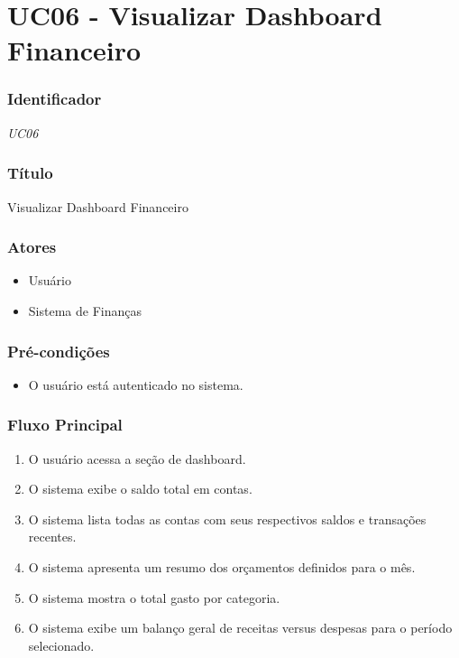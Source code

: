 \chapter{UC06 - Visualizar Dashboard Financeiro}
\label{apendiceUC06}

\subsection*{Identificador}
\textit{UC06}

\subsection*{Título}
Visualizar Dashboard Financeiro

\subsection*{Atores}
\begin{addmargin}[1.5cm]{0cm}
	\begin{itemize}
		\item Usuário
		\item Sistema de Finanças
	\end{itemize}
\end{addmargin}

\subsection*{Pré-condições}
\begin{addmargin}[1.5cm]{0cm}
	\begin{itemize}
		\item O usuário está autenticado no sistema.
	\end{itemize}
\end{addmargin}

\subsection*{Fluxo Principal}
\begin{addmargin}[1.5cm]{0cm}
	\begin{enumerate}
		\item O usuário acessa a seção de dashboard.
		\item O sistema exibe o saldo total em contas.
		\item O sistema lista todas as contas com seus respectivos saldos e transações recentes.
		\item O sistema apresenta um resumo dos orçamentos definidos para o mês.
		\item O sistema mostra o total gasto por categoria.
		\item O sistema exibe um balanço geral de receitas versus despesas para o período selecionado.
	\end{enumerate}
\end{addmargin}

